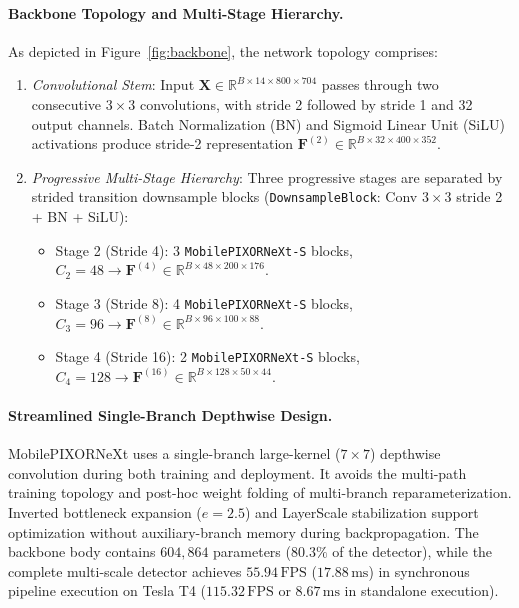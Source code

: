 \paragraph{Backbone Topology and Multi-Stage Hierarchy.}
As depicted in Figure~\ref{fig:backbone}, the network topology comprises:
\begin{enumerate}
    \item \textit{Convolutional Stem}: Input $\mathbf{X} \in \mathbb{R}^{B \times 14 \times 800 \times 704}$ passes through two consecutive $3 \times 3$ convolutions, with stride 2 followed by stride 1 and 32 output channels. Batch Normalization (BN) and Sigmoid Linear Unit (SiLU) activations produce stride-2 representation $\mathbf{F}^{(2)} \in \mathbb{R}^{B \times 32 \times 400 \times 352}$.
    \item \textit{Progressive Multi-Stage Hierarchy}: Three progressive stages are separated by strided transition downsample blocks (\texttt{DownsampleBlock}: Conv $3 \times 3$ stride 2 + BN + SiLU):
    \begin{itemize}
        \item Stage 2 (Stride 4): 3 \texttt{MobilePIXORNeXt-S} blocks, $C_2 = 48 \rightarrow \mathbf{F}^{(4)} \in \mathbb{R}^{B \times 48 \times 200 \times 176}$.
        \item Stage 3 (Stride 8): 4 \texttt{MobilePIXORNeXt-S} blocks, $C_3 = 96 \rightarrow \mathbf{F}^{(8)} \in \mathbb{R}^{B \times 96 \times 100 \times 88}$.
        \item Stage 4 (Stride 16): 2 \texttt{MobilePIXORNeXt-S} blocks, $C_4 = 128 \rightarrow \mathbf{F}^{(16)} \in \mathbb{R}^{B \times 128 \times 50 \times 44}$.
    \end{itemize}
\end{enumerate}

\paragraph{Streamlined Single-Branch Depthwise Design.}
MobilePIXORNeXt uses a single-branch large-kernel ($7 \times 7$) depthwise convolution during both training and deployment. It avoids the multi-path training topology and post-hoc weight folding of multi-branch reparameterization. Inverted bottleneck expansion ($e=2.5$) and LayerScale stabilization support optimization without auxiliary-branch memory during backpropagation. The backbone body contains $604,864$ parameters ($80.3\%$ of the detector), while the complete multi-scale detector achieves $55.94\,\text{FPS}$ ($17.88\,\text{ms}$) in synchronous pipeline execution on Tesla T4 ($115.32\,\text{FPS}$ or $8.67\,\text{ms}$ in standalone execution).

